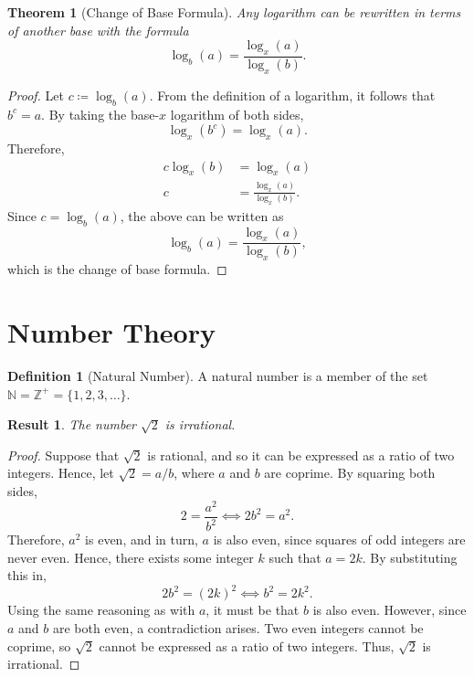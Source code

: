 \documentclass[headings=standardclasses]{scrartcl}
\newtheorem{theorem}{Theorem}[subsection]
\newtheorem{result}{Result}[subsection]
\theoremstyle{definition}
\newtheorem{definition}{Definition}[subsection]
\begin{document}
\begin{theorem}[Change of Base Formula]
  Any logarithm can be rewritten in terms of another base with the formula
  \[ \log_{b}(a) = \frac{\log_{x}(a)}{\log_{x}(b)}. \]
\end{theorem}

\begin{proof}
  Let \(c ≔ \log_b(a)\). From the definition of a logarithm, it follows
  that \(b^c = a\). By taking the base-\(x\) logarithm of both sides,
  \begin{equation*}
      \log_x(b^c) = \log_x(a).
  \end{equation*}
  Therefore,
  \begin{align*}
      c\log_x(b) &= \log_x(a) \\
               c &= \frac{\log_x(a)}{\log_x(b)}.
  \end{align*}
  Since \(c = \log_b(a)\), the above can be written as
  \begin{equation*}
    \log_b(a) = \frac{\log_x(a)}{\log_x(b)},
  \end{equation*}
  which is the change of base formula.
\end{proof}

\section{Number Theory}

\begin{definition}[Natural Number]
  A natural number is a member of the set \(ℕ = ℤ^{+} = \{1, 2, 3, \ldots\}\).
\end{definition}

\begin{result}
  The number \(\sqrt{2}\) is irrational.
\end{result}

\begin{proof}
  Suppose that \(\sqrt{2}\) is rational, and so it can be expressed as a ratio
  of two integers. Hence, let \(\sqrt{2} = a/b\), where \(a\) and \(b\) are
  coprime. By squaring both sides,
  \begin{equation*}
    2 = \frac{a^2}{b^2} ⟺ 2b^2 = a^2.
  \end{equation*}
  Therefore, \(a^2\) is even, and in turn, \(a\) is also even, since squares of
  odd integers are never even. Hence, there exists some integer \(k\) such that
  \(a = 2k\). By substituting this in,
  \begin{equation*}
    2b^2 = {(2k)}^2 ⟺ b^2 = 2k^2.
  \end{equation*}
  Using the same reasoning as with \(a\), it must be that \(b\) is also even.
  However, since \(a\) and \(b\) are both even, a contradiction arises. Two
  even integers cannot be coprime, so \(\sqrt{2}\) cannot be expressed as a
  ratio of two integers. Thus, \(\sqrt{2}\) is irrational.
\end{proof}
\end{document}
